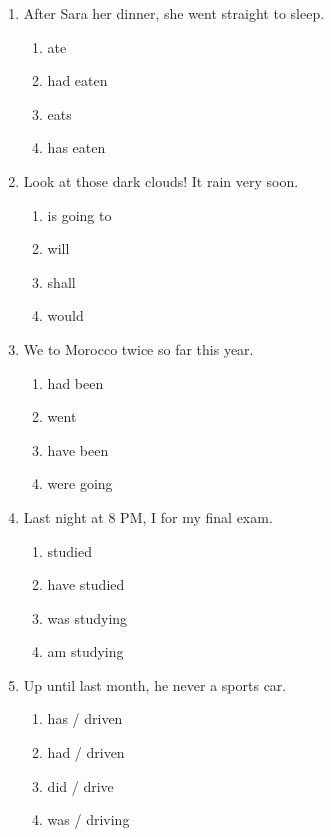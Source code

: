 \documentclass[11pt, a4paper]{article}
\begin{document}
\begin{enumerate}[leftmargin=1.8em, itemsep=10pt]
    \item After Sara \dotfill her dinner, she went straight to sleep.
    \begin{enumerate}[label=(\Alph*), itemsep=2pt]
        \item ate
        \item had eaten
        \item eats
        \item has eaten
    \end{enumerate}

    \item Look at those dark clouds! It \dotfill rain very soon.
    \begin{enumerate}[label=(\Alph*), itemsep=2pt]
        \item is going to
        \item will
        \item shall
        \item would
    \end{enumerate}

    \item We \dotfill to Morocco twice so far this year.
    \begin{enumerate}[label=(\Alph*), itemsep=2pt]
        \item had been
        \item went
        \item have been
        \item were going
    \end{enumerate}

    \item Last night at 8 PM, I \dotfill for my final exam.
    \begin{enumerate}[label=(\Alph*), itemsep=2pt]
        \item studied
        \item have studied
        \item was studying
        \item am studying
    \end{enumerate}

    \item Up until last month, he \dotfill never \dotfill a sports car.
    \begin{enumerate}[label=(\Alph*), itemsep=2pt]
        \item has / driven
        \item had / driven
        \item did / drive
        \item was / driving
    \end{enumerate}


\end{enumerate}
\end{document}
